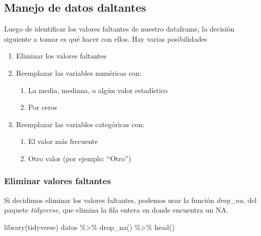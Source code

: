\documentclass[
  letterpaper,
  DIV=11,
  numbers=noendperiod]{scrreprt}
\newenvironment{Shaded}{\begin{snugshade}}{\end{snugshade}}
\newcommand{\FunctionTok}[1]{\textcolor[rgb]{0.28,0.35,0.67}{#1}}
\newcommand{\NormalTok}[1]{\textcolor[rgb]{0.00,0.23,0.31}{#1}}
\newcommand{\SpecialCharTok}[1]{\textcolor[rgb]{0.37,0.37,0.37}{#1}}
\providecommand{\tightlist}{%
  \setlength{\itemsep}{0pt}\setlength{\parskip}{0pt}}\usepackage{longtable,booktabs,array}
\begin{document}
\hypertarget{manejo-de-datos-daltantes}{%
\subsection{Manejo de datos daltantes}\label{manejo-de-datos-daltantes}}

Luego de identificar los valores faltantes de nuestro dataframe, la
decisión siguiente a tomar es qué hacer con ellos. Hay varias
posibilidades

\begin{enumerate}
\def\labelenumi{\arabic{enumi}.}
\tightlist
\item
  Eliminar los valores faltantes
\item
  Reemplazar las variables numéricas con:

  \begin{enumerate}
  \def\labelenumii{\arabic{enumii}.}
  \item
    La media, mediana, o algún valor estadístico
  \item
    Por ceros
  \end{enumerate}
\item
  Reemplazar las variables categóricas con:

  \begin{enumerate}
  \def\labelenumii{\arabic{enumii}.}
  \item
    El valor más frecuente
  \item
    Otro valor (por ejemplo: ``Otro'')
  \end{enumerate}
\end{enumerate}

\hypertarget{eliminar-valores-faltantes}{%
\subsubsection{Eliminar valores
faltantes}\label{eliminar-valores-faltantes}}

Si decidimos eliminar los valores faltantes, podemos usar la función
\emph{drop\_na,} del paquete \emph{tidyverse,} que elimina la fila
entera en donde encuentra un NA.

\begin{Shaded}
\begin{Highlighting}[]
\FunctionTok{library}\NormalTok{(tidyverse)}
\NormalTok{datos }\SpecialCharTok{\%\textgreater{}\%} \FunctionTok{drop\_na}\NormalTok{() }\SpecialCharTok{\%\textgreater{}\%} \FunctionTok{head}\NormalTok{()}
\end{Highlighting}
\end{Shaded}
\end{document}
